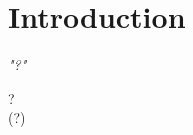 \chapter{Introduction}

\setlength{}
\setlength\epigraphrule{0pt}

\epigraph{\emph{"?"}}{? \\(?)}








